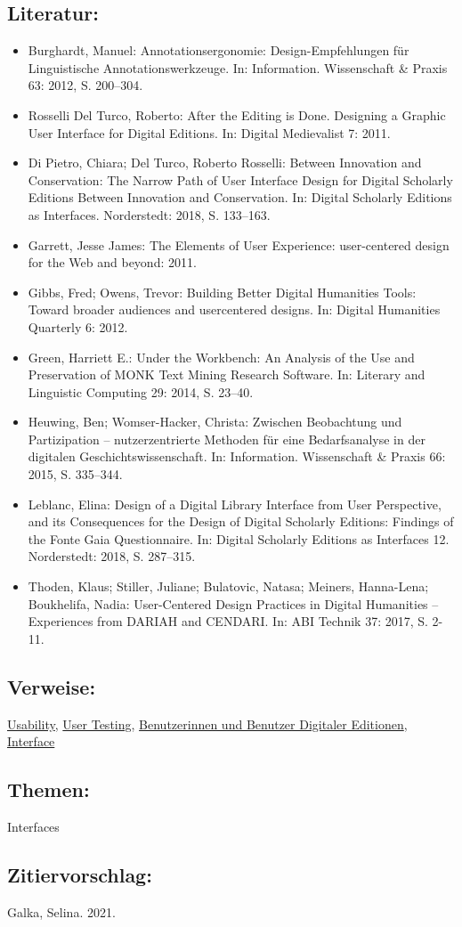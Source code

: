\documentclass{article}
\begin{document}
        \subsection*{Literatur:}\begin{itemize}\item Burghardt, Manuel: Annotationsergonomie: Design-Empfehlungen für Linguistische Annotationswerkzeuge. In: Information. Wissenschaft & Praxis 63: 2012, S. 200–304.\item Rosselli Del Turco, Roberto: After the Editing is Done. Designing a Graphic User Interface for Digital Editions. In: Digital Medievalist 7: 2011.\item Di Pietro, Chiara; Del Turco, Roberto Rosselli: Between Innovation and Conservation: The Narrow Path of User Interface Design for Digital Scholarly Editions Between Innovation and Conservation. In: Digital Scholarly Editions as Interfaces. Norderstedt: 2018, S. 133–163.\item Garrett, Jesse James: The Elements of User Experience: user-centered design for the Web and beyond: 2011.\item Gibbs, Fred; Owens, Trevor: Building Better Digital Humanities Tools: Toward broader audiences and user­centered designs. In: Digital Humanities Quarterly 6: 2012.\item Green, Harriett E.: Under the Workbench: An Analysis of the Use and Preservation of MONK Text Mining Research Software. In: Literary and Linguistic Computing 29: 2014, S. 23–40.\item Heuwing, Ben; Womser-Hacker, Christa: Zwischen Beobachtung und Partizipation – nutzerzentrierte Methoden für eine Bedarfsanalyse in der digitalen Geschichtswissenschaft. In: Information. Wissenschaft & Praxis 66: 2015, S. 335–344.\item Leblanc, Elina: Design of a Digital Library Interface from User Perspective, and its Consequences for the Design of Digital Scholarly Editions: Findings of the Fonte Gaia Questionnaire. In: Digital Scholarly Editions as Interfaces 12. Norderstedt: 2018, S. 287–315.\item Thoden, Klaus; Stiller, Juliane; Bulatovic, Natasa; Meiners, Hanna-Lena; Boukhelifa, Nadia: User-Centered Design Practices in Digital Humanities – Experiences from DARIAH and CENDARI. In: ABI Technik 37: 2017, S. 2-11.\end{itemize}\subsection*{Verweise:}\href{https://gams.uni-graz.at/o:konde.205}{Usability}, \href{https://gams.uni-graz.at/o:konde.206}{User Testing}, \href{https://gams.uni-graz.at/o:konde.148}{Benutzerinnen und Benutzer Digitaler Editionen}, \href{https://gams.uni-graz.at/o:konde.98}{Interface}\subsection*{Themen:}Interfaces\subsection*{Zitiervorschlag:}Galka, Selina. 2021. 
\end{document}
